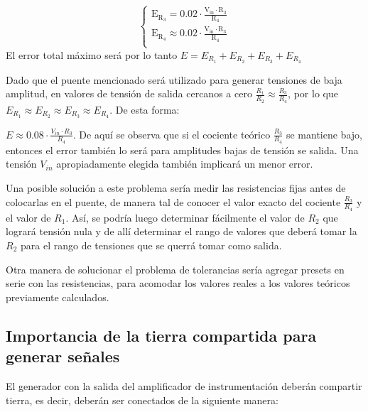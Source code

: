 \documentclass[../../tc_tp3_main.tex]{subfiles}
\begin{document}
 	 	 	\begin{equation}
  	   \left\{
	  	    \begin{array}{ll}
		 					\mathrm{E_{R_3} = 0.02 \cdot \frac{V_{in}\cdot R_3}{R_4}}\\
			 				\mathrm{E_{R_4}  \approx 0.02 \cdot \frac{V_{in} \cdot R_3}{R_4}}  \\
	     	 \end{array}
	     	\right.
 	\end{equation}
 	El error total máximo será por lo tanto $E = E_{R_1} + E_{R_2} + E_{R_3} + E_{R_4}$\par
 	Dado que el puente mencionado será utilizado para generar tensiones de baja amplitud, en valores de tensión de salida cercanos a cero $\frac{R_1}{R_2}\approx\frac{R_3}{R_4}$, por lo que $E_{R_1} \approx E_{R_2} \approx E_{R_3} \approx E_{R_4}$. De esta forma: \par
 	$E \approx 0.08 \cdot \frac{V_{in}\cdot R_3}{R_4}$. De aquí se observa que si el cociente teórico $\frac{R_3}{R_4}$ se mantiene bajo, entonces el error también lo será para amplitudes bajas de tensión se salida. Una tensión $V_{in}$ apropiadamente elegida también implicará un menor error.\par
 	Una posible solución a este problema sería medir las resistencias fijas antes de colocarlas en el puente, de manera tal de conocer el valor exacto del cociente $\frac{R_3}{R_4}$ y el valor de $R_1$. Así, se podría luego determinar fácilmente el valor de $R_2$ que logrará tensión nula y de allí determinar el rango de valores que deberá tomar la $R_2$ para el rango de tensiones que se querrá tomar como salida. \par

 	Otra manera de solucionar el problema de tolerancias sería agregar presets en serie con las resistencias, para acomodar los valores reales a los valores teóricos previamente calculados.

\subsection{Importancia de la tierra compartida para generar señales}

El generador con la salida del amplificador de instrumentación deberán compartir tierra, es decir, deberán ser conectados de la siguiente manera:
\end{document}
